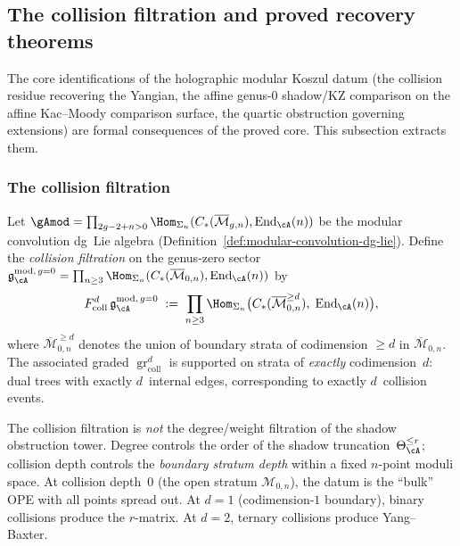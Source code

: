 \subsection{The collision filtration and proved recovery theorems}
\label{subsec:collision-filtration-recovery}

The core identifications of the holographic modular Koszul datum (the collision residue recovering
the Yangian, the affine genus-$0$ shadow/KZ comparison on the
affine Kac--Moody comparison surface, the quartic obstruction governing
extensions) are formal consequences
of the proved core. This subsection extracts them.

\subsubsection{The collision filtration}

\begin{definition}
\label{def:collision-filtration}
Let $\gAmod = \prod_{2g-2+n>0}
\Hom_{\Sigma_n}(C_*(\overline{\mathcal{M}}_{g,n}),
\operatorname{End}_\cA(n))$
be the modular convolution dg~Lie algebra
(Definition~\ref{def:modular-convolution-dg-lie}).
Define the \emph{collision filtration} on the genus-zero sector
$\mathfrak{g}_{\cA}^{\mathrm{mod},\,g{=}0} = \prod_{n \geq 3}
\Hom_{\Sigma_n}(C_*(\overline{\mathcal{M}}_{0,n}),
\operatorname{End}_\cA(n))$ by
\begin{equation}\label{eq:collision-filtration}
F^d_{\mathrm{coll}}\, \mathfrak{g}_{\cA}^{\mathrm{mod},\,g{=}0}
\;:=\;
\prod_{n \geq 3}
\Hom_{\Sigma_n}\bigl(
 C_*(\overline{\mathcal{M}}_{0,n}^{\geq d}),\;
 \operatorname{End}_\cA(n)\bigr),
\end{equation}
where $\overline{\mathcal{M}}_{0,n}^{\geq d}$ denotes the union of
boundary strata of codimension $\geq d$ in
$\overline{\mathcal{M}}_{0,n}$. The associated graded
$\operatorname{gr}^d_{\mathrm{coll}}$ is supported on
strata of \emph{exactly} codimension~$d$: dual trees with
exactly $d$~internal edges, corresponding to exactly
$d$~collision events.
\end{definition}

\begin{remark}
\label{rem:collision-vs-degree}
The collision filtration is \emph{not} the degree/weight filtration of
the shadow obstruction tower. Degree controls the order of the shadow
truncation~$\Theta_\cA^{\leq r}$; collision depth controls the
\emph{boundary stratum depth} within a fixed $n$-point moduli space.
At collision depth~$0$ (the open stratum $\mathcal{M}_{0,n}$), the
datum is the ``bulk'' OPE with all points spread out.
At $d = 1$ (codimension-$1$ boundary), binary collisions produce the
$r$-matrix. At $d = 2$, ternary collisions produce Yang--Baxter.
\end{remark}

